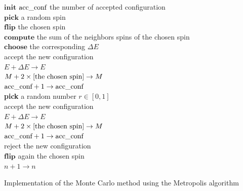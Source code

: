 \documentclass[a4paper, twoside, 11pt]{report}
\theoremstyle{theorem}
\theoremstyle{remark}
\theoremstyle{exemple}
\begin{document}
        \begin{center}
            \begin{algorithm}[H]
            
            \SetAlgoLined
            
                $\textbf{init}$ $\textnormal{acc\_conf}$ the number of accepted configuration\\
                    {
                        $\textbf{pick}$ a random spin\\
                        $\textbf{flip}$ the chosen spin\\
                        $\textbf{compute}$ the sum of the neighbors spins of the chosen spin\\
                        $\textbf{choose}$ the corresponding $\Delta E$ \\                
                
                        {
                            accept the new configuration\\
                            $E + \Delta E \rightarrow E$\\
                            $M + 2 \times \textnormal{[the chosen spin]} \rightarrow M$\\
                            $\textnormal{acc\_conf} + 1 \rightarrow \textnormal{acc\_conf}$\\
                        }{
                            \textbf{pick} a random number $r \in [0,1]$\\
                            {
                                accept the new configuration\\
                                $E + \Delta E \rightarrow E$\\
                                $M + 2 \times \textnormal{[the chosen spin]} \rightarrow M$\\
                                $\textnormal{acc\_conf} + 1 \rightarrow \textnormal{acc\_conf}$\\                                
                            }{
                                reject the new configuration\\
                                $\textbf{flip}$ again the chosen spin\\
                            }
                        }
                        $n + 1 \rightarrow n$
                    }
              
            \caption{Implementation of the Monte Carlo method using the Metropolis algorithm}
            \end{algorithm}
        \end{center}        
        
\end{document}
